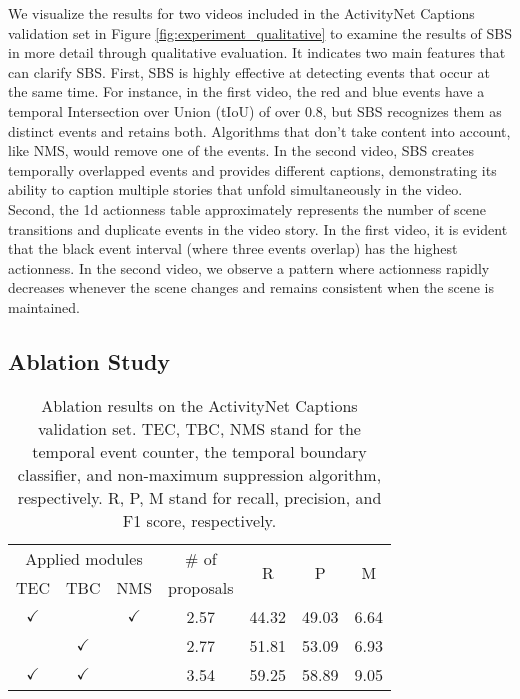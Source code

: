 We visualize the results for two videos included in the ActivityNet Captions validation set in Figure \ref{fig:experiment_qualitative} to examine the results of SBS in more detail through qualitative evaluation.
It indicates two main features that can clarify SBS.
First, SBS is highly effective at detecting events that occur at the same time.
For instance, in the first video, the red and blue events have a temporal Intersection over Union (tIoU) of over 0.8, but SBS recognizes them as distinct events and retains both. Algorithms that don't take content into account, like NMS, would remove one of the events.
In the second video, SBS creates temporally overlapped events and provides different captions, demonstrating its ability to caption multiple stories that unfold simultaneously in the video.
Second, the 1d actionness table approximately represents the number of scene transitions and duplicate events in the video story.
In the first video, it is evident that the black event interval (where three events overlap) has the highest actionness.
In the second video, we observe a pattern where actionness rapidly decreases whenever the scene changes and remains consistent when the scene is maintained.

\subsection{Ablation Study}
\label{subsec:exp_ablation}

\begin{table}[t]
  \parbox{\linewidth}{
    \centering
    \caption{
      Ablation results on the ActivityNet Captions validation set.
      TEC, TBC, NMS stand for the temporal event counter, the temporal boundary classifier, and non-maximum suppression algorithm, respectively.
      R, P, M stand for recall, precision, and F1 score, respectively.
    }
    \begin{tabular}{ccc|c|c|c|c}
      \hline
      \multicolumn{3}{c|}{Applied modules} & \# of        & \multirow{2}{*}{R} & \multirow{2}{*}{P} & \multirow{2}{*}{M}                \\
      TEC                                  & TBC          & NMS                & proposals          &                    &              \\
      \hline
      $\checkmark$                         &              & $\checkmark$       & 2.57               & 44.32              & 49.03 & 6.64 \\
                                           & $\checkmark$ &                    & 2.77               & 51.81              & 53.09 & 6.93 \\
      $\checkmark$                         & $\checkmark$ &                    & 3.54               & 59.25              & 58.89 & 9.05 \\
      \hline
    \end{tabular}
    \label{tab:exp_ablation_module}
  }
\end{table}

